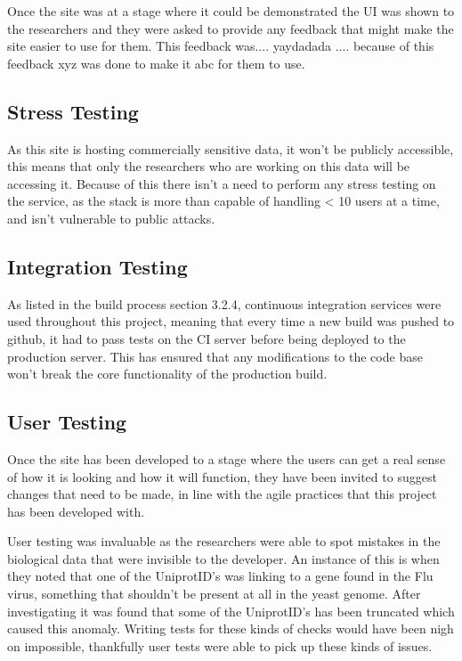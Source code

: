 Once the site was at a stage where it could be demonstrated the UI was shown to the researchers and they were asked to provide any feedback that might make the site easier to use for them. This feedback was.... yaydadada .... because of this feedback xyz was done to make it abc for them to use.

\subsection{Stress Testing}
As this site is hosting commercially sensitive data, it won't be publicly accessible, this means that only the researchers who are working on this data will be accessing it. Because of this there isn't a need to perform any stress testing on the service, as the stack is more than capable of handling < 10 users at a time, and isn't vulnerable to public attacks. 

\subsection{Integration Testing}
As listed in the build process section 3.2.4, continuous integration services were used throughout this project, meaning that every time a new build was pushed to github, it had to pass tests on the CI server before being deployed to the production server. This has ensured that any modifications to the code base won't break the core functionality of the production build. 

\subsection{User Testing}
Once the site has been developed to a stage where the users can get a real sense of how it is looking and how it will function, they have been invited to suggest changes that need to be made, in line with the agile practices that this project has been developed with. 

User testing was invaluable as the researchers were able to spot mistakes in the biological data that were invisible to the developer. An instance of this is when they noted that one of the UniprotID's was linking to a gene found in the Flu virus, something that shouldn't be present at all in the yeast genome. After investigating it was found that some of the UniprotID's has been truncated which caused this anomaly. Writing tests for these kinds of checks would have been nigh on impossible, thankfully user tests were able to pick up these kinds of issues. 


